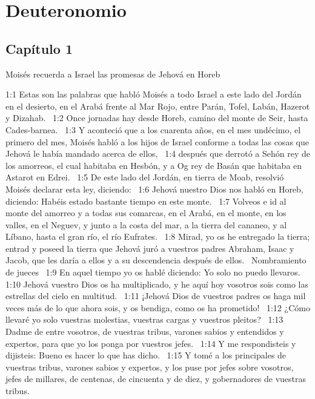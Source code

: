 \chapter{Deuteronomio}

\section*{Capítulo 1}


{Moisés recuerda a Israel las promesas de Jehová en Horeb } 



1:1 Estas son las palabras que habló Moisés a todo Israel a este lado del Jordán en el desierto, en el Arabá frente al Mar Rojo, entre Parán, Tofel, Labán, Hazerot y Dizahab.  
1:2 Once jornadas hay desde Horeb, camino del monte de Seir, hasta Cades-barnea.  
1:3 Y aconteció que a los cuarenta años, en el mes undécimo, el primero del mes, Moisés habló a los hijos de Israel conforme a todas las cosas que Jehová le había mandado acerca de ellos,  
1:4 después que derrotó a Sehón rey de los amorreos, el cual habitaba en Hesbón, y a Og rey de Basán que habitaba en Astarot en Edrei.  
1:5 De este lado del Jordán, en tierra de Moab, resolvió Moisés declarar esta ley, diciendo:  
1:6 Jehová nuestro Dios nos habló en Horeb, diciendo: Habéis estado bastante tiempo en este monte.  
1:7 Volveos e id al monte del amorreo y a todas sus comarcas, en el Arabá, en el monte, en los valles, en el Neguev, y junto a la costa del mar, a la tierra del cananeo, y al Líbano, hasta el gran río, el río Eufrates.  
1:8 Mirad, yo os he entregado la tierra; entrad y poseed la tierra que Jehová juró a vuestros padres Abraham, Isaac y Jacob, que les daría a ellos y a su descendencia después de ellos.  
Nombramiento de jueces   
1:9 En aquel tiempo yo os hablé diciendo: Yo solo no puedo llevaros.  
1:10 Jehová vuestro Dios os ha multiplicado, y he aquí hoy vosotros sois como las estrellas del cielo en multitud.  
1:11 ¡Jehová Dios de vuestros padres os haga mil veces más de lo que ahora sois, y os bendiga, como os ha prometido!  
1:12 ¿Cómo llevaré yo solo vuestras molestias, vuestras cargas y vuestros pleitos?  
1:13 Dadme de entre vosotros, de vuestras tribus, varones sabios y entendidos y expertos, para que yo los ponga por vuestros jefes.  
1:14 Y me respondisteis y dijisteis: Bueno es hacer lo que has dicho.  
1:15 Y tomé a los principales de vuestras tribus, varones sabios y expertos, y los puse por jefes sobre vosotros, jefes de millares, de centenas, de cincuenta y de diez, y gobernadores de vuestras tribus.  
